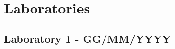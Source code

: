 \documentclass[../main.tex]{subfiles}
\begin{document}
\clearpage
\thispagestyle{empty}
\vspace*{7cm}
\section{Laboratories}
\vspace*{1.5cm}



\vspace*{1.5cm}
\subsection{Laboratory 1 - GG/MM/YYYY}
\end{document}
